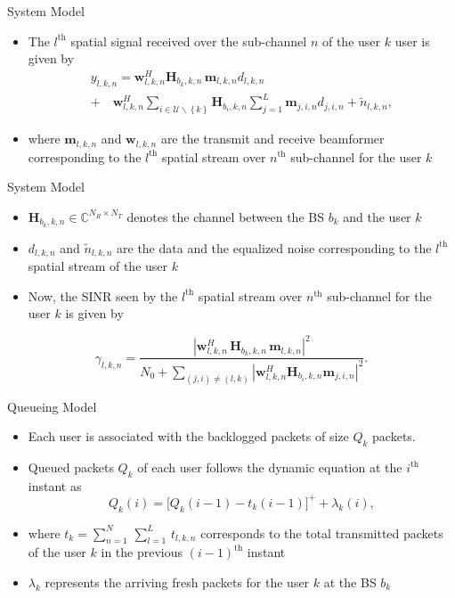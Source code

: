 \documentclass[10pt]{beamer}
\newcommand{\me}[1]{\( #1 \)}
\newcommand{\mc}[1]{\mathcal{#1}}
\newcommand{\set}[1]{\left \lbrace #1 \right \rbrace }
\newcommand{\mvec}[2]{\mathbf{#1}_{#2}}
\newcommand{\ith}[1]{{#1}^{\mathrm{th}}}
\begin{document}
\begin{frame}{System Model}
\begin{itemize}
\item The \me{\ith{l}} spatial signal received over the sub-channel \me{n} of the user \me{k} user is given by
\begin{multline*}\label{eqn-1}
y_{l,k,n} = \mvec{w}{l,k,n}^H \mvec{H}{b_k,k,n} \,\mvec{m}{l,k,n} d_{l,k,n} \\
 + \quad{} \mvec{w}{l,k,n}^H \sum_{i \in \mc{U} \backslash \set{k}} \mvec{H}{b_i,k,n} \sum_{j = 1}^L \mvec{m}{j,i,n}d_{j,i,n} + \tilde{n}_{l,k,n},
\end{multline*}
\item where \me{\mvec{m}{l,k,n}} and \me{\mvec{w}{l,k,n}} are the transmit and receive beamformer corresponding to the \me{\ith{l}} spatial stream over \me{\ith{n}} sub-channel for the user \me{k}
\end{itemize}
\end{frame}

\begin{frame}{System Model}
\begin{itemize}
\item \me{\mvec{H}{b_k,k,n} \in \mathbb{C}^{N_R \times N_T}} denotes the channel between the \acs{BS} \me{b_k} and the user \me{k}
\item \me{d_{l,k,n}} and \me{\tilde{n}_{l,k,n}} are the data and the equalized noise corresponding to the \me{\ith{l}} spatial stream of the user \me{k}
\item Now, the \acs{SINR} seen by the \me{\ith{l}} spatial stream over \me{\ith{n}} sub-channel for the user \me{k} is given by
\end{itemize}
\[ \gamma_{l,k,n} = \dfrac{\left |\mvec{w}{l,k,n}^H \, \mvec{H}{b_k,k,n} \, \mvec{m}{l,k,n} \right |^2}{N_0 + \sum_{(j,i) \neq (l,k)} |\mvec{w}{l,k,n}^H \mvec{H}{b_i,k,n} \mvec{m}{j,i,n} |^2}.\]
\end{frame}

\begin{frame}{Queueing Model}
\begin{itemize}
\item Each user is associated with the backlogged packets of size \me{Q_k} packets.
\item Queued packets \me{Q_k} of each user follows the dynamic equation at the \me{\ith{i}} instant as
\begin{equation}
Q_k(i) = \Big [ Q_k(i-1) - t_k(i-1) \Big ]^+ + \lambda_k(i),
\label{queue_dynamics}
\end{equation}
\item where \me{t_k = \sum_{n = 1}^N \, \sum_{l = 1}^L \, t_{l,k,n}} corresponds to the total transmitted packets of the user \me{k} in the previous \me{\ith{(i-1)}} instant
\item \me{\lambda_k} represents the arriving fresh packets for the user \me{k} at the \ac{BS} \me{b_k}
\end{itemize}
\end{frame}
\end{document}
